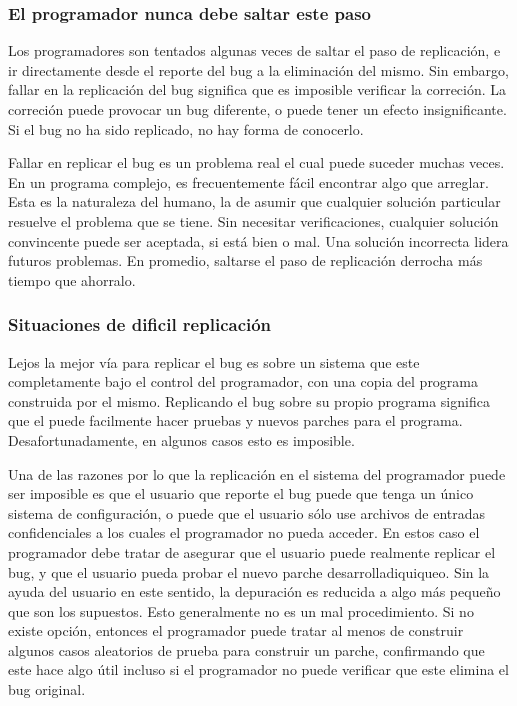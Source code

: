 \documentclass[12pt,legalpaper]{report}
\begin{document}
\subsubsection{El programador nunca debe saltar este paso}


Los programadores son tentados algunas veces  de saltar el paso de replicación, e ir directamente desde el reporte del bug a la eliminación del mismo.  Sin embargo, fallar en la replicación del bug significa que es imposible verificar la correción.  La correción puede provocar un bug diferente, o puede tener un efecto insignificante.  Si el bug no ha sido replicado, no hay forma de conocerlo.

Fallar en replicar el bug es un problema real el cual puede suceder muchas veces.  En un programa complejo, es frecuentemente fácil encontrar algo que arreglar.  Esta es la naturaleza del humano, la de asumir que cualquier solución particular resuelve el problema que se tiene.  Sin necesitar verificaciones, cualquier solución convincente puede ser aceptada, si está bien o mal.  Una solución incorrecta lidera futuros problemas.  En promedio, saltarse el paso de replicación derrocha más tiempo que ahorralo.


\subsubsection{Situaciones de dificil replicación}

Lejos la mejor vía para replicar el bug es sobre un sistema que este completamente bajo el control del programador, con una copia del programa construida por el mismo.  Replicando el bug sobre su propio programa significa que el puede facilmente hacer pruebas y nuevos parches para el programa.  Desafortunadamente, en algunos casos esto es imposible.

Una de las razones por lo que la replicación en el sistema del programador puede ser imposible es que el usuario que reporte el bug puede que tenga un único sistema de configuración, o puede que el usuario sólo use archivos de entradas confidenciales a los cuales el programador no pueda acceder.  En estos caso el programador debe tratar de asegurar que el usuario puede realmente replicar el bug, y que el usuario pueda probar el nuevo parche desarrolladiquiqueo.  Sin la ayuda del usuario en este sentido, la depuración es reducida a algo más pequeño que son los supuestos.  Esto generalmente no es un mal procedimiento.  Si no existe opción, entonces el programador puede tratar al menos de construir algunos casos aleatorios de prueba para construir un parche, confirmando que este hace algo útil incluso si el programador no puede verificar que este elimina el bug original.
\end{document}
